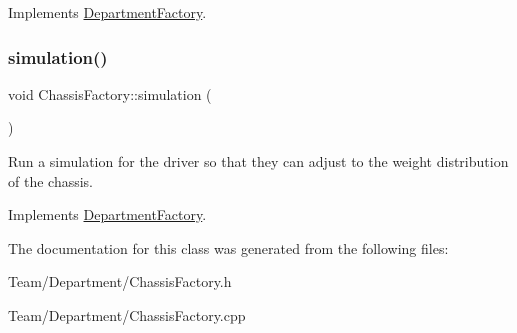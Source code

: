Implements \hyperlink{classDepartmentFactory_a41e5c96ee84f8237cb08d31cd782efae}{Department\+Factory}.

\mbox{\label{classChassisFactory_a80d7b3f0cb610967088f6ed89a71b2bb}} 
\subsubsection{\texorpdfstring{simulation()}{simulation()}}
{\footnotesize\ttfamily void Chassis\+Factory\+::simulation (\begin{DoxyParamCaption}{ }\end{DoxyParamCaption})\hspace{0.3cm}{\ttfamily [virtual]}}

Run a simulation for the driver so that they can adjust to the weight distribution of the chassis. 

Implements \hyperlink{classDepartmentFactory_ad7360e63135822e44031053723ff95fc}{Department\+Factory}.



The documentation for this class was generated from the following files\+:\begin{DoxyCompactItemize}
\item 
Team/\+Department/Chassis\+Factory.\+h\item 
Team/\+Department/Chassis\+Factory.\+cpp\end{DoxyCompactItemize}
